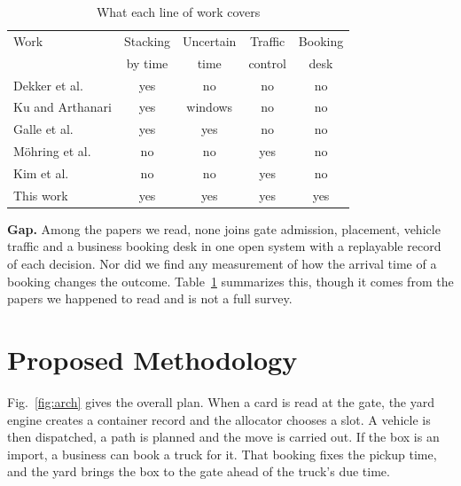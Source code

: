 \documentclass[conference]{IEEEtran}
\begin{document}
\begin{table}[t]
\caption{What each line of work covers}
\label{tab:related}
\centering
\small
\begin{tabular}{lcccc}
\toprule
Work & Stacking & Uncertain & Traffic & Booking \\
 & by time & time & control & desk \\
\midrule
Dekker et al. \cite{dekker2006} & yes & no & no & no \\
Ku and Arthanari \cite{ku2016} & yes & windows & no & no \\
Galle et al. \cite{galle2017} & yes & yes & no & no \\
M\"ohring et al. \cite{mohring2005} & no & no & yes & no \\
Kim et al. \cite{kim2007} & no & no & yes & no \\
This work & yes & yes & yes & yes \\
\bottomrule
\end{tabular}
\end{table}

\textbf{Gap.} Among the papers we read, none joins gate admission, placement, vehicle traffic and a business booking desk in one open system with a replayable record of each decision. Nor did we find any measurement of how the arrival time of a booking changes the outcome. Table~\ref{tab:related} summarizes this, though it comes from the papers we happened to read and is not a full survey.

\section{Proposed Methodology}
Fig.~\ref{fig:arch} gives the overall plan. When a card is read at the gate, the yard engine creates a container record and the allocator chooses a slot. A vehicle is then dispatched, a path is planned and the move is carried out. If the box is an import, a business can book a truck for it. That booking fixes the pickup time, and the yard brings the box to the gate ahead of the truck's due time.
\end{document}
